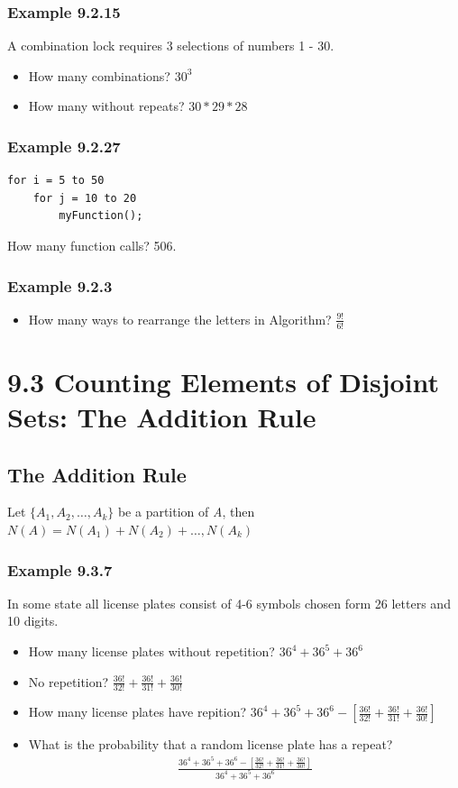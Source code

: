 \documentclass{article}
\begin{document}
\subsubsection*{Example 9.2.15}
A combination lock requires 3 selections of numbers 1 - 30.
\begin{itemize}
\item How many combinations? $30^3$
\item How many without repeats? $30 * 29 * 28$
\end{itemize}


\subsubsection*{Example 9.2.27}
\begin{verbatim}
for i = 5 to 50
    for j = 10 to 20
        myFunction();
\end{verbatim}

How many function calls? 506.

\subsubsection*{Example 9.2.3}
\begin{itemize}
\item How many ways to rearrange the letters in Algorithm? $\frac{9!}{6!}$
\end{itemize}

\section*{9.3 Counting Elements of Disjoint Sets: The Addition Rule}
\subsection{The Addition Rule}
Let $ \{ A_1, A_2, \ldots, A_k \}$ be a partition of \textit{A}, then $N(A) = N(A_1) + N(A_2) + \ldots, N(A_k)$

\subsubsection{Example 9.3.7}
In some state all license plates consist of 4-6 symbols chosen form 26 letters and 10 digits.

\begin{itemize}
\item How many license plates without repetition? $36^4 + 36^5 + 36^6$
\item No repetition? $\frac{36!}{32!} + \frac{36!}{31!} + \frac{36!}{30!}$
\item How many license plates have repition? $36^4 + 36^5 + 36^6 - [\frac{36!}{32!} + \frac{36!}{31!} + \frac{36!}{30!}]$
\item What is the probability that a random license plate has a repeat? 
\begin{align}
\frac{36^4 + 36^5 + 36^6 - [\frac{36!}{32!} + \frac{36!}{31!} + \frac{36!}{30!}]}{36^4 + 36^5 + 36^6}
\end{align}
\end{itemize}
\end{document}
